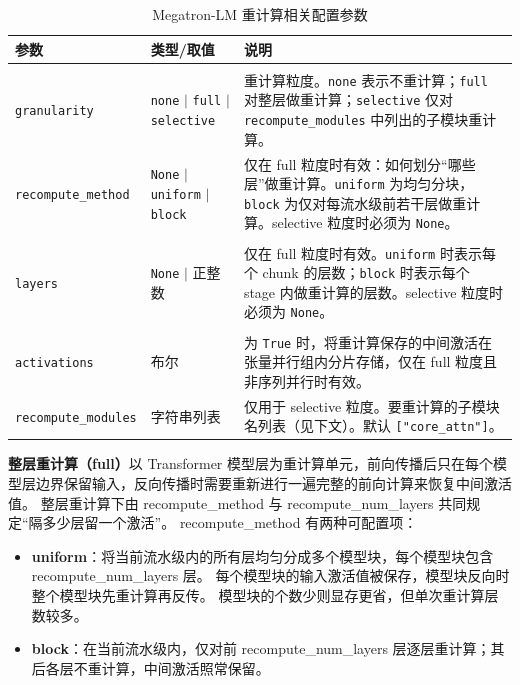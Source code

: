 \begin{table}[htbp]
	\centering
	\caption{Megatron-LM 重计算相关配置参数}
	\label{tab:chap4-megatron-params}
	\renewcommand{\arraystretch}{1.45}
	\begin{tabular}{@{}>{\raggedright\arraybackslash}m{3.5cm}>{\raggedright\arraybackslash}m{2.8cm}>{\raggedright\arraybackslash}m{\dimexpr\textwidth-3.5cm-2.8cm-4\tabcolsep\relax}@{}}
		\toprule
		\textbf{参数} & \textbf{类型/取值} & \textbf{说明} \\
		\midrule
		\makecell[l]{\texttt{recompute\_}\\\texttt{granularity}} & \texttt{none} $\mid$ \texttt{full} $\mid$ \texttt{selective} & 重计算粒度。\texttt{none} 表示不重计算；\texttt{full} 对整层做重计算；\texttt{selective} 仅对 \texttt{recompute\_modules} 中列出的子模块重计算。 \\
		\hdashline
		\texttt{recompute\_method} & \texttt{None} $\mid$ \texttt{uniform} $\mid$ \texttt{block} & 仅在 full 粒度时有效：如何划分“哪些层”做重计算。\texttt{uniform} 为均匀分块，\texttt{block} 为仅对每流水级前若干层做重计算。selective 粒度时必须为 \texttt{None}。 \\
		\hdashline
		\makecell[l]{\texttt{recompute\_num\_}\\\texttt{layers}} & \texttt{None} $\mid$ 正整数 & 仅在 full 粒度时有效。\texttt{uniform} 时表示每个 chunk 的层数；\texttt{block} 时表示每个 stage 内做重计算的层数。selective 粒度时必须为 \texttt{None}。 \\
		\hdashline
		\makecell[l]{\texttt{distribute\_saved\_}\\\texttt{activations}} & 布尔 & 为 \texttt{True} 时，将重计算保存的中间激活在张量并行组内分片存储，仅在 full 粒度且非序列并行时有效。 \\
		\hdashline
		\texttt{recompute\_modules} & 字符串列表 & 仅用于 selective 粒度。要重计算的子模块名列表（见下文）。默认 \texttt{["core\_attn"]}。 \\
		\bottomrule
	\end{tabular}
\end{table}

\textbf{整层重计算（full）}以 Transformer 模型层为重计算单元，前向传播后只在每个模型层边界保留输入，反向传播时需要重新进行一遍完整的前向计算来恢复中间激活值。
整层重计算下由 recompute\_method 与 recompute\_num\_layers 共同规定“隔多少层留一个激活”。
recompute\_method 有两种可配置项：
\begin{itemize}
	\item \textbf{uniform}：将当前流水级内的所有层均匀分成多个模型块，每个模型块包含 recompute\_num\_layers 层。
  每个模型块的输入激活值被保存，模型块反向时整个模型块先重计算再反传。
  模型块的个数少则显存更省，但单次重计算层数较多。
	\item \textbf{block}：在当前流水级内，仅对前 recompute\_num\_layers 层逐层重计算；其后各层不重计算，中间激活照常保留。
\end{itemize}

